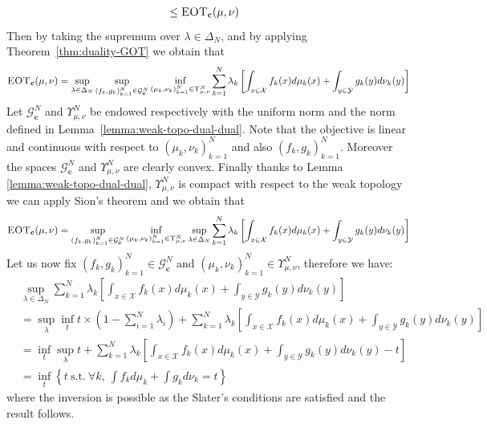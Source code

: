 \begin{prv*}
\begin{align*}
  &\leq \textsc{EOT}_{\mathbf{c}}(\mu,\nu)
\end{align*}
Then by taking the supremum over $\lambda\in\Delta_N$, and by applying Theorem~\ref{thm:duality-GOT} we obtain that
\begin{align*}
\textsc{EOT}_{\mathbf{c}}(\mu,\nu)
 =\sup_{\lambda\in \Delta_N} \sup\limits_{(f_k,g_k)_{k=1}^N\in  \mathcal{G}^{N}_{\mathbf{c}}} \inf_{(\mu_k,\nu_k)_{k=1}^N\in\Upsilon_{\mu,\nu}^N } \sum_{k=1}^N \lambda_k \left[\int_{x\in\mathcal{X}} f_k(x)d\mu_k(x)+ \int_{y\in\mathcal{Y}} g_k(y)d\nu_k(y)\right]
\end{align*}
Let $\mathcal{G}^{N}_{\mathbf{c}}$ and $\Upsilon_{\mu,\nu}^N$ be endowed respectively with the uniform norm and the norm defined in Lemma~\ref{lemma:weak-topo-dual-dual}. Note that the objective is linear and continuous with respect to $(\mu_k,\nu_k)_{k=1}^N$ and also $(f_k,g_k)_{k=1}^N$. Moreover the spaces $\mathcal{G}^{N}_{\mathbf{c}}$ and $\Upsilon_{\mu,\nu}^N$ are clearly convex. Finally thanks to Lemma \ref{lemma:weak-topo-dual-dual}, $\Upsilon_{\mu,\nu}^N$ is compact with respect to the weak topology we can apply Sion's theorem \cite{sion1958} and we obtain that
\begin{align*}
\textsc{EOT}_{\mathbf{c}}(\mu,\nu)
 = \sup\limits_{(f_k,g_k)_{k=1}^N\in  \mathcal{G}^{N}_{\mathbf{c}}} \inf_{(\mu_k,\nu_k)_{k=1}^N\in\Upsilon_{\mu,\nu}^N }\sup_{\lambda\in \Delta_N}  \sum_{k=1}^N \lambda_k \left[\int_{x\in\mathcal{X}} f_k(x)d\mu_k(x)+ \int_{y\in\mathcal{Y}} g_k(y)d\nu_k(y)\right]
\end{align*}
Let us now fix $(f_k,g_k)_{k=1}^N\in  \mathcal{G}^{N}_{\mathbf{c}}$ and $(\mu_k,\nu_k)_{k=1}^N\in\Upsilon_{\mu,\nu}^N$, therefore we have:
\begin{align*}
    &\sup_{\lambda\in \Delta_N}  \sum_{k=1}^N \lambda_k \left[\int_{x\in\mathcal{X}} f_k(x)d\mu_k(x)+ \int_{y\in\mathcal{Y}} g_k(y)d\nu_k(y)\right] \\
    &=\sup_{\lambda}\inf_{t}  t\times\left(1-\sum_{i=1}^N \lambda_i \right) + \sum_{k=1}^N \lambda_k \left[\int_{x\in\mathcal{X}} f_k(x)d\mu_k(x)+ \int_{y\in\mathcal{Y}} g_k(y)d\nu_k(y)\right]\\
     &=\inf_{t} \sup_{\lambda} t + \sum_{k=1}^N \lambda_k \left[\int_{x\in\mathcal{X}} f_k(x)d\mu_k(x)+ \int_{y\in\mathcal{Y}} g_k(y)d\nu_k(y)- t\right]\\
     &= \inf_{t} \left\{t~\mathrm{ s.t.}~\forall k, ~ \int f_kd\mu_k+ \int g_kd\nu_k = t \right\}
\end{align*}
where the inversion is possible as the Slater's conditions are satisfied  and the result follows.
\end{prv*}

